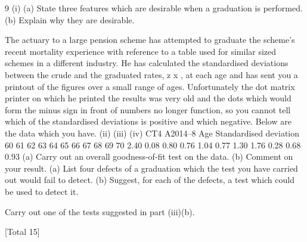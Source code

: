 \documentclass[a4paper,12pt]{article}
\begin{document}
\begin{enumerate}
9
(i)
(a) State three features which are desirable when a graduation is
performed.
(b) Explain why they are desirable.

The actuary to a large pension scheme has attempted to graduate the scheme’s recent
mortality experience with reference to a table used for similar sized schemes in a
different industry. He has calculated the standardised deviations between the crude
and the graduated rates, z x , at each age and has sent you a printout of the figures over
a small range of ages. Unfortunately the dot matrix printer on which he printed the
results was very old and the dots which would form the minus sign in front of
numbers no longer function, so you cannot tell which of the standardised deviations is
positive and which negative. Below are the data which you have.
(ii)
(iii)
(iv)
CT4 A2014–8
Age Standardised
deviation
60
61
62
63
64
65
66
67
68
69
70 2.40
0.08
0.80
0.76
1.04
0.77
1.30
1.76
0.28
0.68
0.93
(a) Carry out an overall goodness-of-fit test on the data.
(b) Comment on your result.
(a) List four defects of a graduation which the test you have carried out
would fail to detect.
(b) Suggest, for each of the defects, a test which could be used to detect it.

Carry out one of the tests suggested in part (iii)(b).


[Total 15]


\end{enumerate}
\end{document}
